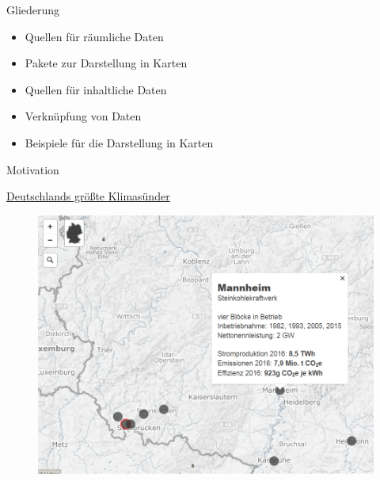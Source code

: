 \begin{frame}[fragile]{Gliederung}

\begin{itemize}
\tightlist
\item
  Quellen für räumliche Daten
\item
  Pakete zur Darstellung in Karten
\item
  Quellen für inhaltliche Daten
\item
  Verknüpfung von Daten
\item
  Beispiele für die Darstellung in Karten
\end{itemize}

\begin{Shaded}
\begin{Highlighting}[]
\end{Highlighting}
\end{Shaded}

\begin{Shaded}
\begin{Highlighting}[]
\NormalTok{(}\NormalTok{)}
\NormalTok{(}\NormalTok{)}
\end{Highlighting}
\end{Shaded}

\end{frame}

\begin{frame}{Motivation}

\begin{block}{\href{http://www.spiegel.de/wissenschaft/mensch/deutschland-das-sind-die-groessten-klimasuender-a-1178207.html}{Deutschlands
größte Klimasünder}}

\begin{figure}
\centering
\includegraphics{figure/Kohle_mannheim.PNG}
\caption{}
\end{figure}

\end{block}

\end{frame}

